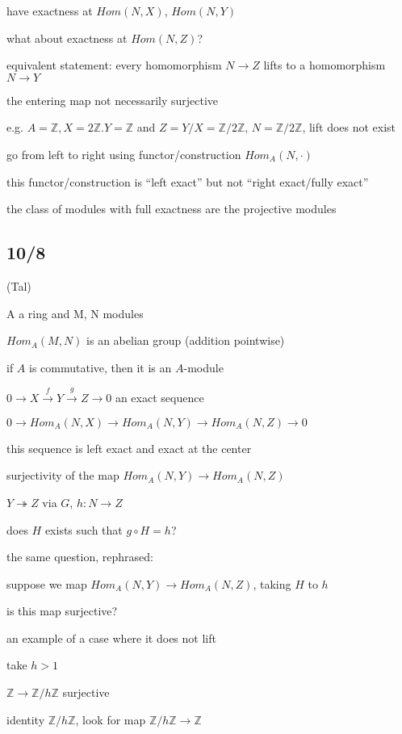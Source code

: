 \documentclass[12pt]{article}
\begin{document}
have exactness at $Hom(N, X)$, $Hom(N, Y)$

what about exactness at $Hom(N, Z)$?

equivalent statement: every homomorphism $N \to Z$ lifts to a homomorphism $N \to Y$

the entering map not necessarily surjective

e.g. $A = \mathds{Z}, X = 2\mathds{Z}. Y = \mathds{Z}$ and $Z = Y/X = \mathds{Z}/2\mathds{Z}$, $N = \mathds{Z}/2\mathds{Z}$, lift does not exist

go from left to right using functor/construction $Hom_A(N, \cdot)$

this functor/construction is ``left exact'' but not ``right exact/fully exact''

the class of modules with full exactness are the projective modules

\subsection{10/8}

\noindent
(Tal)

\noindent
A a ring and M, N modules

$Hom_A(M, N)$ is an abelian group (addition pointwise)

if $A$ is commutative, then it is an $A$-module

\noindent
$0 \to X \xrightarrow{f} Y \xrightarrow{g} Z \to 0$ an exact sequence

$0 \to Hom_A(N, X) \to Hom_A(N, Y) \to Hom_A(N, Z) \to 0$ 

this sequence is left exact and exact at the center

\noindent
surjectivity of the map $Hom_A(N, Y) \to Hom_A(N, Z)$

$Y \twoheadrightarrow Z$ via $G$, $h: N \to Z$

does $H$ exists such that $g \circ H = h$?

the same question, rephrased:

suppose we map $Hom_A(N, Y) \to Hom_A(N, Z)$, taking $H$ to $h$

is this map surjective?

\noindent
an example of a case where it does not lift

take $h > 1$

$\mathds{Z} \to \mathds{Z}/h\mathds{Z}$ surjective

identity $\mathds{Z}/h\mathds{Z}$, look for map $\mathds{Z}/h\mathds{Z} \to \mathds{Z}$
\end{document}

